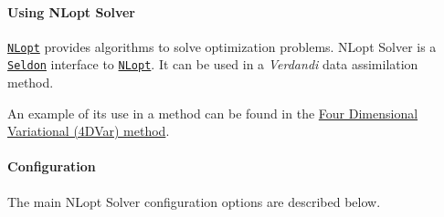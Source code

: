 \documentclass{tufte-book}
\begin{document}
\hypertarget{optimization_solver_using_nlopt}{}\paragraph{\-Using N\-Lopt Solver}\label{optimization_solver_using_nlopt}

\href{http://ab-initio.mit.edu/wiki/index.php/NLopt}{\tt \-N\-Lopt} provides algorithms to solve optimization problems. \-N\-Lopt \-Solver is a \href{http://www.seldon.sourceforge.net}{\tt \-Seldon} interface to \href{http://ab-initio.mit.edu/wiki/index.php/NLopt}{\tt \-N\-Lopt}. \-It can be used in a \-\emph{Verdandi} data assimilation method.

\-An example of its use in a method can be found in the \hyperlink{four_dimensional_variational}{\-Four \-Dimensional \-Variational (4\-D\-Var) method}.

\hypertarget{optimization_solver_nlopt_configuration}{}\paragraph{\-Configuration}\label{optimization_solver_nlopt_configuration}

\-The main \-N\-Lopt \-Solver configuration options are described below.
\end{document}

